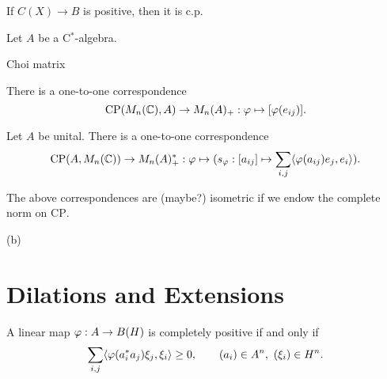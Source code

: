 \documentclass{../../large}
\begin{document}
\begin{prb}
If $C(X)\to B$ is positive, then it is c.p.
\end{prb}


\begin{prb}
Let $A$ be a C$^*$-algebra.
\begin{parts}
\item Choi matrix
\item
There is a one-to-one correspondence
\[\mathrm{CP}(M_n(\mathbb{C}),A)\to M_n(A)_+:\varphi\mapsto[\varphi(e_{ij})].\]
\item
Let $A$ be unital.
There is a one-to-one correspondence
\[\mathrm{CP}(A,M_n(\mathbb{C}))\to M_n(A)^*_+:\varphi\mapsto(s_\varphi:[a_{ij}]\mapsto\sum_{i,j}\langle\varphi(a_{ij})e_j,e_i\rangle).\]
\item The above correspondences are (maybe?) isometric if we endow the complete norm on $\mathrm{CP}$.
\end{parts}
\end{prb}
\begin{pf}
(b)


\end{pf}

\section{Dilations and Extensions}

A linear map $\varphi:A\to B(H)$ is completely positive if and only if
\[\sum_{i,j}\langle\varphi(a_i^*a_j)\xi_j,\xi_i\rangle\ge0,\qquad (a_i)\in A^n,\ (\xi_i)\in H^n.\]
\end{document}
